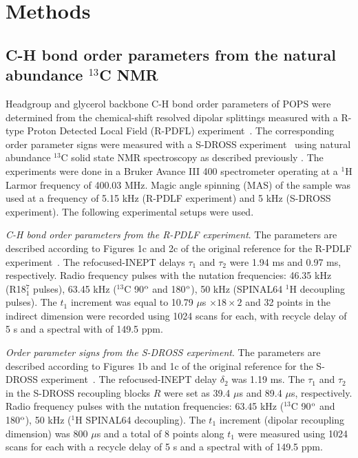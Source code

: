 \documentclass[aps,prl,superscriptaddress,twocolumn]{revtex4}
\begin{document}
\section{Methods}

\subsection{C-H bond order parameters from the natural abundance $^{13}$C NMR}

Headgroup and glycerol backbone C-H bond order parameters of POPS
were determined from the chemical-shift resolved dipolar splittings
measured with a R-type Proton Detected Local Field (R-PDFL) experiment~\cite{dvinskikh04}.
The corresponding order parameter signs were measured with a S-DROSS experiment~\cite{gross97}
using natural abundance $^{13}$C solid state NMR spectroscopy as described previously \cite{ferreira13,ferreira16}.
The experiments were done in a Bruker Avance III 400 spectrometer operating at a $^1$H Larmor frequency of 400.03 MHz.
Magic angle spinning (MAS) of the sample was used at a frequency of 5.15 kHz (R-PDLF experiment) and 5 kHz (S-DROSS experiment).
The following experimental setups were used.

{\emph{C-H bond order parameters from the R-PDLF experiment}}. The parameters are described according to Figures 1c and 2c of the original reference
for the R-PDLF experiment~\cite{dvinskikh04}.  The refocused-INEPT delays $\tau_1$ and $\tau_2$ were 1.94 ms and 0.97 ms, respectively.
Radio frequency pulses with the nutation frequencies: 46.35 kHz (R18$^7_1$ pulses), 63.45 kHz ($^{13}$C 90$^{\rm{o}}$ and 180$^{\rm{o}}$),
50 kHz (SPINAL64 $^1$H decoupling pulses). The $t_1$ increment was equal to 10.79 $\mu$s $\times18\times2$ and 32 points in the indirect
dimension were recorded using 1024 scans for each, with recycle delay of 5 s and a spectral with of 149.5 ppm.

\emph{Order parameter signs from the S-DROSS experiment}.
The parameters are described according to Figures 1b and 1c of the original reference for the S-DROSS
experiment~\cite{gross97}. The refocused-INEPT delay $\delta_2$ was 1.19 ms. The $\tau_1$ and $\tau_2$ in the S-DROSS recoupling
blocks $R$ were set as 39.4 $\mu$s and 89.4 $\mu$s, respectively. Radio frequency pulses with the nutation
frequencies: 63.45 kHz ($^{13}$C 90$^{\rm{o}}$ and 180$^{\rm{o}}$), 50 kHz ($^1$H SPINAL64 decoupling).
The $t_1$ increment (dipolar recoupling dimension) was 800 $\mu$s and a total of 8 points along $t_1$ were
measured using 1024 scans for each with a recycle delay of 5 s and a spectral with of 149.5 ppm.
\end{document}
